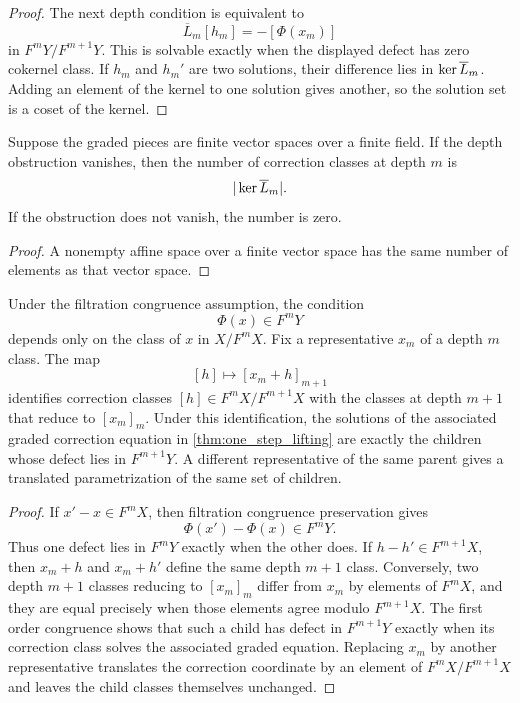 \begin{proof}
The next depth condition is equivalent to
\[
\overline L_m[h_m]
=-[\Phi(x_m)]
\]
in $F^mY/F^{m+1}Y$.  This is solvable exactly when the displayed defect has zero cokernel class.  If $h_m$ and $h_m'$ are two solutions, their difference lies in $\operatorname{ker}\overline L_m$.  Adding an element of the kernel to one solution gives another, so the solution set is a coset of the kernel.
\end{proof}

\begin{corollary}\label{cor:finite_branch_count}
Suppose the graded pieces are finite vector spaces over a finite field.  If the depth obstruction vanishes, then the number of correction classes at depth $m$ is
\[
|\operatorname{ker}\overline L_m|.
\]
If the obstruction does not vanish, the number is zero.
\end{corollary}

\begin{proof}
A nonempty affine space over a finite vector space has the same number of elements as that vector space.
\end{proof}


\begin{lemma}\label{lem:well_defined_lift_classes}
Under the filtration congruence assumption, the condition
\[
\Phi(x)\in F^mY
\]
depends only on the class of $x$ in $X/F^mX$.  Fix a representative $x_m$ of a depth $m$ class.  The map
\[
[h]\longmapsto[x_m+h]_{m+1}
\]
identifies correction classes $[h]\in F^mX/F^{m+1}X$ with the classes at depth $m+1$ that reduce to $[x_m]_m$.  Under this identification, the solutions of the associated graded correction equation in \cref{thm:one_step_lifting} are exactly the children whose defect lies in $F^{m+1}Y$.  A different representative of the same parent gives a translated parametrization of the same set of children.
\end{lemma}

\begin{proof}
If $x'-x\in F^mX$, then filtration congruence preservation gives
\[
\Phi(x')-\Phi(x)\in F^mY.
\]
Thus one defect lies in $F^mY$ exactly when the other does.  If $h-h'\in F^{m+1}X$, then $x_m+h$ and $x_m+h'$ define the same depth $m+1$ class.  Conversely, two depth $m+1$ classes reducing to $[x_m]_m$ differ from $x_m$ by elements of $F^mX$, and they are equal precisely when those elements agree modulo $F^{m+1}X$.  The first order congruence shows that such a child has defect in $F^{m+1}Y$ exactly when its correction class solves the associated graded equation.  Replacing $x_m$ by another representative translates the correction coordinate by an element of $F^mX/F^{m+1}X$ and leaves the child classes themselves unchanged.
\end{proof}

